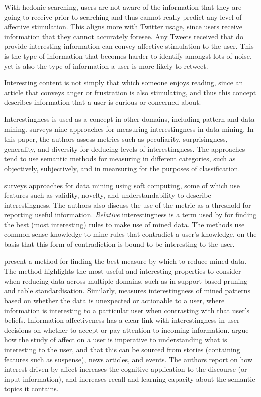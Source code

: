 With hedonic searching, users are not aware of the information that they are going to receive prior to searching and thus cannot really predict any level of affective stimulation. This aligns more with Twitter usage, since users receive information that they cannot accurately foresee. Any Tweets received that do provide interesting information can convey affective stimulation to the user. This is the type of information that becomes harder to identify amongst lots of noise, yet is also the type of information a user is more likely to retweet.

Interesting content is not simply that which someone enjoys reading, since an article that conveys anger or frustration is also stimulating, and thus this concept describes information that a user is curious or concerned about. 

Interestingness is used as a concept in other domains, including pattern and data mining. \citet{geng06} surveys nine approaches for measuring interestingness in data mining. In this paper, the authors assess metrics such as peculiarity, surprisingness, generality, and diversity for deducing levels of interestingness. The approaches tend to use semantic methods for measuring in different categories, such as objectively, subjectively, and in mearsuring for the purposes of classification.

\citet{mitra02} surveys approaches for data mining using soft computing, some of which use features such as validity, novelty, and understandability to describe interestingness. The authors also discuss the use of the metric as a threshold for reporting useful information. \textit{Relative} interestingness is a term used by \citet{hussain00} for finding the best (most interesting) rules to make use of mined data. The methods use common sense knowledge to mine rules that contradict a user's knowledge, on the basis that this form of contradiction is bound to be interesting to the user. 

\citet{tan02} present a method for finding the best measure by which to reduce mined data. The method highlights the most useful and interesting properties to consider when reducing data across multiple domains, such as in support-based pruning and table standardisation. Similarly, \citet{silberschatz95} measures interestingness of mined patterns based on whether the data is unexpected or actionable to a user, where information is interesting to a particular user when contrasting with that user's beliefs. Information affectiveness has a clear link with interestingness in user decisions on whether to accept or pay attention to incoming information. \citet{hidi86} argue how the study of affect on a user is imperative to understanding what is interesting to the user, and that this can be sourced from stories (containing features such as suspense), news articles, and events. The authors report on how interest driven by affect increases the cognitive application to the discourse (or input information), and increases recall and learning capacity about the semantic topics it contains.

